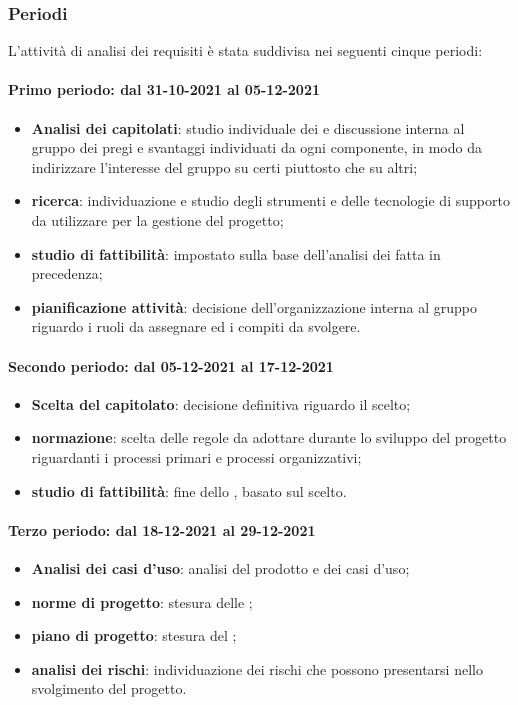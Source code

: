 \subsubsection{Periodi} 
L'attività di analisi dei requisiti è stata suddivisa nei seguenti cinque periodi: 

\paragraph{Primo periodo: dal 31-10-2021 al 05-12-2021} 
\begin{itemize} 
	\item \textbf{Analisi dei capitolati}: studio individuale dei  e discussione interna al gruppo dei pregi e svantaggi individuati da ogni componente, in modo da indirizzare l’interesse del gruppo su certi  piuttosto che su altri; 
	\item \textbf{ricerca}: individuazione e studio degli strumenti e delle tecnologie di supporto da utilizzare per la gestione del progetto; 
	\item \textbf{studio di fattibilità}: impostato sulla base dell'analisi dei  fatta in precedenza; 
	\item \textbf{pianificazione attività}: decisione dell'organizzazione interna al gruppo riguardo i ruoli da assegnare ed i compiti da svolgere. 
\end{itemize} 

\paragraph{Secondo periodo: dal 05-12-2021 al 17-12-2021} 
\begin{itemize} 
	\item \textbf{Scelta del capitolato}: decisione definitiva riguardo il  scelto; 
	\item \textbf{normazione}: scelta delle regole da adottare durante lo sviluppo del progetto riguardanti i 
	processi primari e processi organizzativi; 
	\item \textbf{studio di fattibilità}: fine dello , basato sul  scelto. 
\end{itemize} 

\paragraph{Terzo periodo: dal 18-12-2021 al 29-12-2021} 
\begin{itemize} 
	\item \textbf{Analisi dei casi d'uso}: analisi del prodotto e dei casi d’uso; 
	\item \textbf{norme di progetto}: stesura delle ; 
	\item \textbf{piano di progetto}: stesura del ; 
	\item \textbf{analisi dei rischi}: individuazione dei rischi che possono presentarsi nello svolgimento del progetto. 
\end{itemize} 

